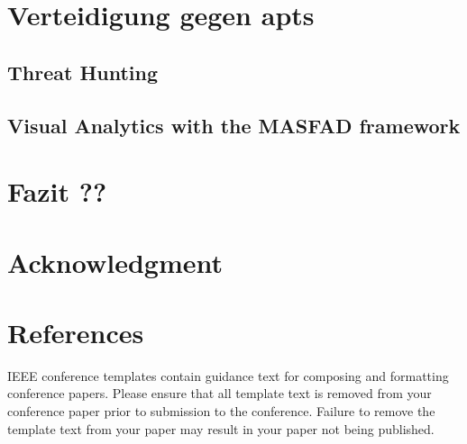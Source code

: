 \documentclass[conference]{IEEEtran}
\begin{document}
\section{Verteidigung gegen \aclp{apt}}
\subsection{Threat Hunting}
\subsection{Visual Analytics with the MASFAD framework}
\section{Fazit ??}

\section*{Acknowledgment}

\section*{References}

\balance





\vspace{12pt}
\color{red}
IEEE conference templates contain guidance text for composing and formatting conference papers. Please ensure that all template text is removed from your conference paper prior to submission to the conference. Failure to remove the template text from your paper may result in your paper not being published.
\end{document}
